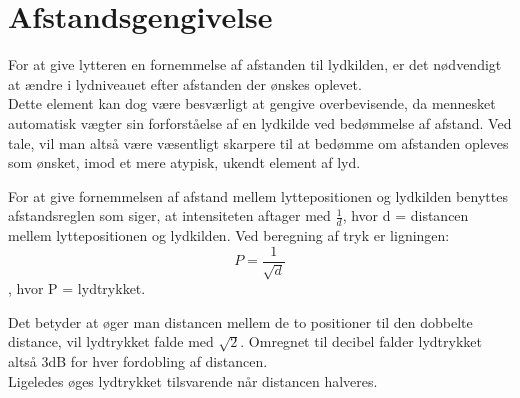 \section{Afstandsgengivelse}

For at give lytteren en fornemmelse af afstanden til lydkilden, er det nødvendigt at ændre i lydniveauet efter afstanden der ønskes oplevet. \\ 
Dette element kan dog være besværligt at gengive overbevisende, da mennesket automatisk vægter sin forforståelse af en lydkilde ved bedømmelse af afstand. Ved tale, vil man altså være væsentligt skarpere til at bedømme om afstanden opleves som ønsket, imod et mere atypisk, ukendt element af lyd\cite{SpatialBook}.

For at give fornemmelsen af afstand mellem lyttepositionen og lydkilden benyttes afstandsreglen som siger, at intensiteten aftager med $\frac{1}{d}$, hvor d = distancen mellem lyttepositionen og lydkilden. Ved beregning af tryk er ligningen:
\begin{equation}
	P=\frac{1}{\sqrt{d}}
\end{equation}, hvor P = lydtrykket.

 Det betyder at øger man distancen mellem de to positioner til den dobbelte distance, vil lydtrykket falde med $\sqrt{2}$. Omregnet til decibel falder lydtrykket altså 3dB for hver fordobling af distancen\cite{AudioMetering}.\\ Ligeledes øges lydtrykket tilsvarende når distancen halveres. 